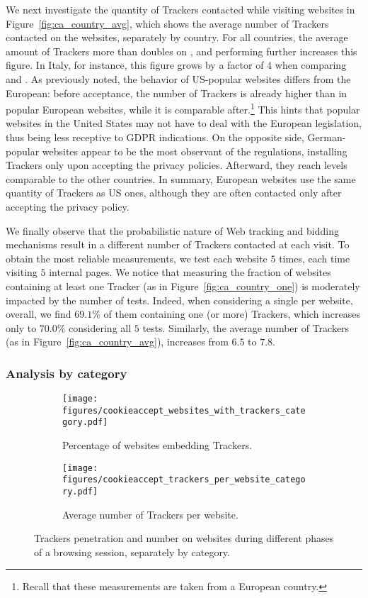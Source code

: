 We next investigate the quantity of Trackers contacted while visiting websites in Figure~\ref{fig:ca_country_avg}, which shows the average number of Trackers contacted on the websites, separately by country. For all countries, the average amount of Trackers more than doubles on \AFTER, and performing \INTERNAL further increases this figure. In Italy, for instance, this figure grows by a factor of $4$ when comparing \BEFORE and \INTERNAL. As previously noted, the behavior of US-popular websites differs from the European: before acceptance, the number of Trackers is already higher than in popular European websites, while it is comparable after.\footnote{Recall that these measurements are taken from a European country.} This hints that popular websites in the United States may not have to deal with the European legislation, thus being less receptive to GDPR indications. On the opposite side, German-popular websites appear to be the most observant of the regulations, installing Trackers only upon accepting the privacy policies. Afterward, they reach levels comparable to the other countries. In summary, European websites use the same quantity of Trackers as US ones, although they are often contacted only after accepting the privacy policy.

We finally observe that the probabilistic nature of Web tracking and bidding mechanisms result in a different number of Trackers contacted at each visit. To obtain the most reliable measurements, we test each website $5$ times, each time visiting $5$ internal pages. We notice that measuring the fraction of websites containing at least one Tracker (as in Figure~\ref{fig:ca_country_one}) is moderately impacted by the number of tests. Indeed, when considering a single \AFTER per website, overall, we find $69.1\%$ of them containing one (or more) Trackers, which increases only to $70.0\%$ considering all $5$ tests. Similarly, the average number of Trackers (as in Figure~\ref{fig:ca_country_avg}), increases from $6.5$ to $7.8$.

\subsubsection{Analysis by category}

\begin{figure*}
    \centering
    \begin{subfigure}[t]{\textwidth}
        \texttt{[image: figures/cookieaccept\_websites\_with\_trackers\_category.pdf]}
        \caption{Percentage of websites embedding Trackers.}
        \label{fig:ca_category_one}
    \end{subfigure}
    \begin{subfigure}[t]{\textwidth}
        \texttt{[image: figures/cookieaccept\_trackers\_per\_website\_category.pdf]}
        \caption{Average number of Trackers per website.}
        \label{fig:ca_category_avg}
    \end{subfigure}
	\caption{Trackers penetration and number  on websites during different phases of a browsing session, separately by category.}
	\label{fig:ca_category}
\end{figure*}

